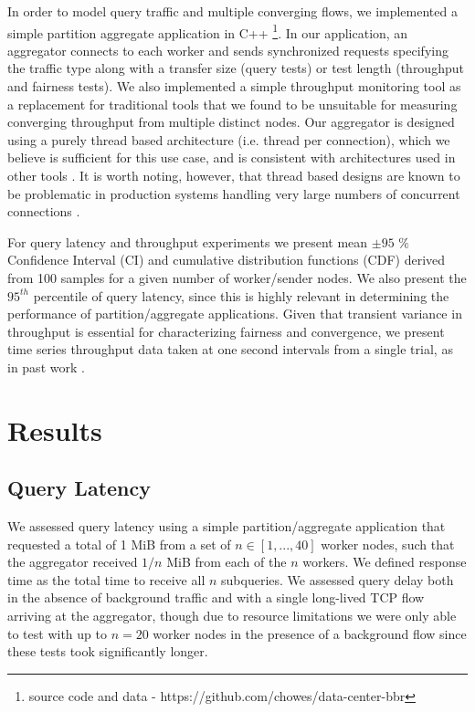 \documentclass[letterpaper,twocolumn,10pt]{article}
\begin{document}
In order to model query traffic and multiple converging flows, we implemented a simple partition aggregate application in C++ \footnote{source code and data -  https://github.com/chowes/data-center-bbr}. In our application, an aggregator connects to each worker and sends synchronized requests specifying the traffic type along with a transfer size (query tests) or test length (throughput and fairness tests). We also implemented a simple throughput monitoring tool as a replacement for traditional tools that we found to be unsuitable for measuring converging throughput from multiple distinct nodes. Our aggregator is designed using a purely thread based architecture (i.e. thread per connection), which we believe is sufficient for this use case, and is consistent with architectures used in other tools \cite{iperf}. It is worth noting, however, that thread based designs are known to be problematic in production systems handling very large numbers of concurrent connections \cite{pariag2007comparing}.

For query latency and throughput experiments we present mean $\pm 95$ $\%$ Confidence Interval (CI) and cumulative distribution functions (CDF) derived from 100 samples for a given number of worker/sender nodes. We also present the $95^{th}$ percentile of query latency, since this is highly relevant in determining the performance of partition/aggregate applications. Given that transient variance in throughput is essential for characterizing fairness and convergence, we present time series throughput data taken at one second intervals from a single trial, as in past work \cite{alizadeh_data_2010, wu_ictcp:_2013}.

\section{Results}

\subsection{Query Latency}

We assessed query latency using a simple partition/aggregate application that requested a total of 1 MiB from a set of $n \in [1, ..., 40]$ worker nodes, such that the aggregator received $1 / n$ MiB from each of the $n$ workers. We defined response time as the total time to receive all $n$ subqueries. We assessed query delay both in the absence of background traffic and with a single long-lived TCP flow arriving at the aggregator, though due to resource limitations we were only able to test with up to $n = 20$ worker nodes in the presence of a background flow since these tests took significantly longer. 
\end{document}
